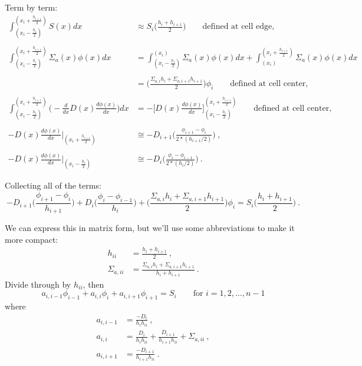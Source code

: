 \documentclass[12pt]{article}
\begin{document}
Term by term:
\begin{align*}
\int_{(x_i - \frac{h_i}{2})}^{(x_i + \frac{h_{i+1}}{2})} S(x) dx &\approx S_i \bigl(\frac{h_i + h_{i+1}}{2}\bigr) \qquad \text{defined at cell edge,} \nonumber \\
&\nonumber\\
%
\int_{(x_i - \frac{h_i}{2})}^{(x_i + \frac{h_{i+1}}{2})} \Sigma_a(x) \phi(x) dx &= 
\int_{(x_i - \frac{h_i}{2})}^{(x_i)} \Sigma_a(x) \phi(x) dx + \int_{(x_i)}^{(x_i + \frac{h_{i+1}}{2})} \Sigma_a(x) \phi(x) dx \nonumber\\
%
\\
&= \biggl(\frac{\Sigma_{a,i}h_i + \Sigma_{a,i+1}h_{i+1}}{2} \biggr)\phi_i\nonumber \qquad \text{defined at cell center,}\\
&\nonumber\\
%
 \int_{(x_i - \frac{h_i}{2})}^{(x_i + \frac{h_{i+1}}{2})} \biggl(  -\frac{d}{dx}D(x)\frac{d \phi(x)}{dx}\biggr) dx &=
-\biggl[D(x)\frac{d \phi(x)}{dx} \biggr]_{(x_i - \frac{h_i}{2})}^{(x_i + \frac{h_{i+1}}{2})} \qquad \text{defined at cell center,}\nonumber \\
%
&\\
-D(x)\frac{d \phi(x)}{dx}\big|_{(x_i + \frac{h_{i+1}}{2})} &\cong -D_{i+1}\biggl(\frac{\phi_{i+1} - \phi_i}{2*(h_{i+1}/2)}\biggr) \:,\nonumber \\
%
&\\
-D(x)\frac{d \phi(x)}{dx}\big|_{(x_i - \frac{h_i}{2})} &\cong -D_{i}\biggl(\frac{\phi_{i} - \phi_{i-1}}{2*(h_{i}/2)}\biggr) \:.\nonumber
\end{align*}

Collecting all of the terms:
%
\begin{equation}
-D_{i+1}\biggl(\frac{\phi_{i+1} - \phi_i}{h_{i+1}}\biggr) + D_{i}\biggl(\frac{\phi_{i} - \phi_{i-1}}{h_{i}}\biggr) + \biggl(\frac{\Sigma_{a,i}h_i + \Sigma_{a,i+1}h_{i+1}}{2} \biggr)\phi_i =   S_i \bigl(\frac{h_i + h_{i+1}}{2}\bigr) \:.\nonumber
\end{equation}

We can express this in matrix form, but we'll use some abbreviations to make it more compact:
\begin{align}
h_{ii} &= \frac{h_i + h_{i+1}}{2} \:,\nonumber \\
%
\Sigma_{a,ii} &= \frac{\Sigma_{a,i}h_i + \Sigma_{a,i+1}h_{i+1}}{h_i + h_{i+1}} \:. \nonumber
\end{align}
Divide through by $h_{ii}$, then
%
\[a_{i,i-1} \phi_{i-1} + a_{i,i}\phi_i + a_{i, i+1} \phi_{i+1} = S_i \qquad \text{for } i = 1, 2, \dots, n-1\]
%
where
%
\begin{align}
a_{i,i-1} &= \frac{-D_i}{h_i h_{ii}} \:,\nonumber \\
a_{i,i} &= \frac{D_i}{h_i h_{ii}} + \frac{D_{i+1}}{h_{i+1} h_{ii}} +\Sigma_{a,ii} \:, \nonumber \\
a_{i,i+1} &= \frac{-D_{i+1}}{h_{i+1} h_{ii}} \:.\nonumber
\end{align}
\end{document}
